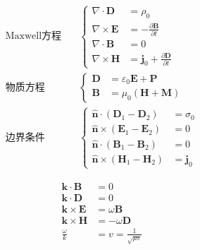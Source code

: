 \documentclass[12pt,onecolumn,a4paper]{book}
\newenvironment{block}[1]{
    \begin{tcolorbox}[colback=blue!5!white,colframe=blue!75!black,title=#1]
}{
    \end{tcolorbox}
}
\numberwithin{table}{subsection}
\numberwithin{equation}{subsection}
\begin{document}
    \begin{block}{Maxwell方程}
        \begin{align}
            \text{Maxwell方程} \quad
             & \left\{
            \begin{aligned}
                \nabla \cdot \mathbf{D}  & = \rho_0                                                \\
                \nabla \times \mathbf{E} & = - \frac{\partial \mathbf{B}}{\partial t}              \\
                \nabla \cdot \mathbf{B}  & = 0                                                     \\
                \nabla \times \mathbf{H} & = \mathbf{j}_0 + \frac{\partial \mathbf{D}}{\partial t}
            \end{aligned}
            \right.    \\
            \text{物质方程} \quad
             & \left\{
            \begin{aligned}
                \mathbf{D} & = \varepsilon_0 \mathbf{E} + \mathbf{P} \\
                \mathbf{B} & = \mu_0 (\mathbf{H} + \mathbf{M})
            \end{aligned}
            \right.    \\
            \text{边界条件} \quad
             & \left\{
            \begin{aligned}
                \hat{\mathbf{n}}\cdot(\mathbf{D}_1- \mathbf{D}_2)  & = \sigma_0     \\
                \hat{\mathbf{n}}\times(\mathbf{E}_1- \mathbf{E}_2) & = 0            \\
                \hat{\mathbf{n}}\cdot(\mathbf{B}_1- \mathbf{B}_2)  & = 0            \\
                \hat{\mathbf{n}}\times(\mathbf{H}_1- \mathbf{H}_2) & = \mathbf{j}_0
            \end{aligned}
            \right.
        \end{align}
    \end{block}

    \begin{block}{电磁波}
        \begin{align}
            \mathbf{k} \cdot \mathbf{B}  & = 0                                    \\
            \mathbf{k} \cdot \mathbf{D}  & = 0                                    \\
            \mathbf{k} \times \mathbf{E} & = \omega \mathbf{B}                    \\
            \mathbf{k} \times \mathbf{H} & = - \omega \mathbf{D}                  \\
            \frac{\omega}{k}             & = v = \frac{1}{\sqrt{\mu \varepsilon}}
        \end{align}
    \end{block}
\end{document}

